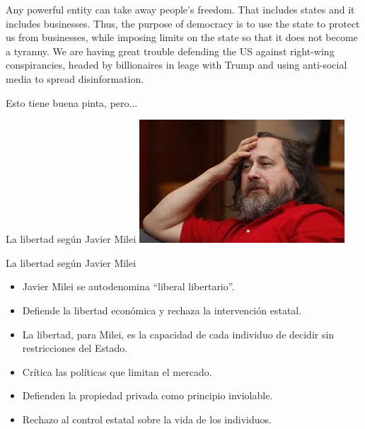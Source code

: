 \documentclass{beamer}
\begin{document}
\begin{frame}
  Any powerful entity can take away people's freedom. That includes states and
  it includes businesses. Thus, the purpose of democracy is to use the state to
  protect us from businesses, while imposing limits on the state so that it does
  not become a tyranny.
  \vfill
  We are having great trouble defending the US against right-wing
  conspirancies, headed by billionaires in leage with Trump and using
  anti-social media to spread disinformation.
\end{frame}

\begin{frame}
  \centering
  \Huge Esto tiene buena pinta, pero...
\end{frame}

\begin{frame}{La libertad según Javier Milei}
  \includegraphics[width=\linewidth]{images/uyy.jpeg}
\end{frame}

\begin{frame}{La libertad según Javier Milei}
    \begin{itemize}
        \item Javier Milei se autodenomina ``liberal libertario''. \pause
        \item Defiende la libertad económica y rechaza la intervención estatal. \pause
        \item La libertad, para Milei, es la capacidad de cada individuo de
          decidir sin restricciones del Estado. \pause
        \item Crítica las políticas que limitan el mercado. \pause
        \item Defienden la propiedad privada como principio inviolable.\pause
        \item Rechazo al control estatal sobre la vida de los individuos.
    \end{itemize}
\end{frame}
\end{document}
